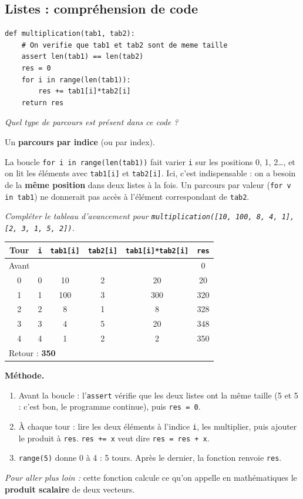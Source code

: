 \documentclass[addpoints, 11pt]{exam}
\newcommand{\enonce}[1]{\textit{#1}\par\smallskip}
\newcommand{\methode}{\par\smallskip\noindent\textbf{Méthode.}\ }
\newcommand{\code}[1]{\texttt{#1}}
\DeclareRobustCommand{\_}{\textunderscore\allowbreak}
\begin{document}
\begin{questions}
\section{Listes : compréhension de code}

\begin{lstlisting}
def multiplication(tab1, tab2):
    # On verifie que tab1 et tab2 sont de meme taille
    assert len(tab1) == len(tab2)
    res = 0
    for i in range(len(tab1)):
        res += tab1[i]*tab2[i]
    return res
\end{lstlisting}

\question[1] \enonce{Quel type de parcours est présent dans ce code ?}
\begin{reponse}
Un \textbf{parcours par indice} (ou par index).
\end{reponse}
La boucle \code{for i in range(len(tab1))} fait varier \code{i} sur les positions 0, 1, 2\dots, et on lit les éléments avec \code{tab1[i]} et \code{tab2[i]}. Ici, c'est indispensable : on a besoin de la \textbf{même position} dans deux listes à la fois. Un parcours par valeur (\code{for v in tab1}) ne donnerait pas accès à l'élément correspondant de \code{tab2}.

\question[3] \enonce{Compléter le tableau d'avancement pour \code{multiplication([10, 100, 8, 4, 1], [2, 3, 1, 5, 2])}.}
\begin{reponse}
\begin{center}
\begin{tabular}{|c|c|c|c|c|c|}
\hline
Tour & \code{i} & \code{tab1[i]} & \code{tab2[i]} & \code{tab1[i]*tab2[i]} & \code{res} \\ \hline
Avant & & & & & 0 \\
0 & 0 & 10 & 2 & 20 & 20 \\
1 & 1 & 100 & 3 & 300 & 320 \\
2 & 2 & 8 & 1 & 8 & 328 \\
3 & 3 & 4 & 5 & 20 & 348 \\
4 & 4 & 1 & 2 & 2 & 350 \\ \hline
\multicolumn{6}{|l|}{Retour : \textbf{350}} \\ \hline
\end{tabular}
\end{center}
\end{reponse}
\methode
\begin{enumerate}
  \item Avant la boucle : l'\code{assert} vérifie que les deux listes ont la même taille (5 et 5 : c'est bon, le programme continue), puis \code{res = 0}.
  \item À chaque tour : lire les deux éléments à l'indice \code{i}, les multiplier, puis ajouter le produit à \code{res}. \code{res += x} veut dire \code{res = res + x}.
  \item \code{range(5)} donne 0 à 4 : 5 tours. Après le dernier, la fonction renvoie \code{res}.
\end{enumerate}
\textit{Pour aller plus loin :} cette fonction calcule ce qu'on appelle en mathématiques le \textbf{produit scalaire} de deux vecteurs.


\end{questions}
\end{document}
